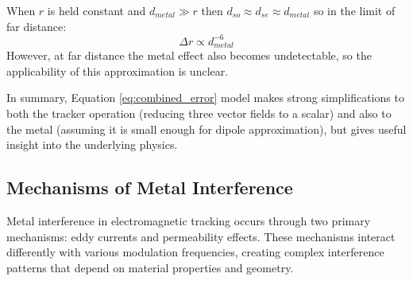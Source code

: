 \documentclass[journal,twoside,web]{ieeecolor}
\begin{document}
When $r$ is held constant and $d_{metal} \gg r$ then $d_{so} \approx d_{se} \approx d_{metal}$ so in the limit of far distance:
\begin{equation}
\Delta r \propto d_{metal}^{-6}
\label{eq:dropoff_power}
\end{equation}
However, at far distance the metal effect also becomes undetectable, so the applicability of this approximation is unclear.

In summary, Equation \eqref{eq:combined_error} model makes strong simplifications to both the tracker operation (reducing three vector fields to a scalar) and also to the metal (assuming it is small enough for dipole approximation), but gives useful insight into the underlying physics.

\subsection{Mechanisms of Metal Interference}
\label{subsec:interference_mechanisms}
Metal interference in electromagnetic tracking occurs through two primary mechanisms: eddy currents and permeability effects. These mechanisms interact differently with various modulation frequencies, creating complex interference patterns that depend on material properties and geometry.
\end{document}
